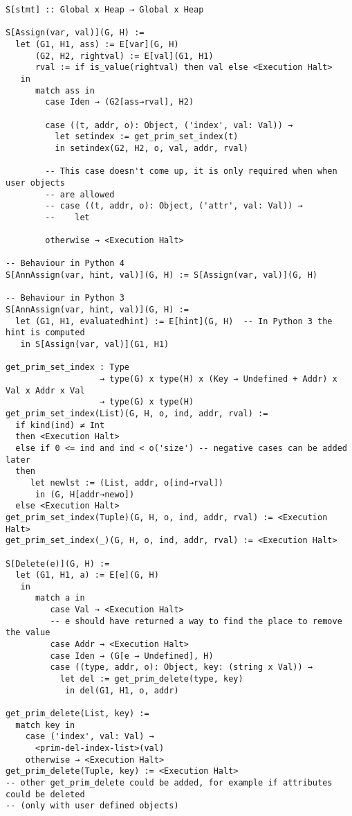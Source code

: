 \begin{verbatim}
S[stmt] :: Global x Heap → Global x Heap

S[Assign(var, val)](G, H) :=
  let (G1, H1, ass) := E[var](G, H)
      (G2, H2, rightval) := E[val](G1, H1)
      rval := if is_value(rightval) then val else <Execution Halt>
   in
      match ass in
        case Iden → (G2[ass→rval], H2)

        case ((t, addr, o): Object, ('index', val: Val)) →
          let setindex := get_prim_set_index(t)
          in setindex(G2, H2, o, val, addr, rval)

        -- This case doesn't come up, it is only required when when user objects
        -- are allowed
        -- case ((t, addr, o): Object, ('attr', val: Val)) →
        --    let

        otherwise → <Execution Halt>

-- Behaviour in Python 4
S[AnnAssign(var, hint, val)](G, H) := S[Assign(var, val)](G, H)

-- Behaviour in Python 3
S[AnnAssign(var, hint, val)](G, H) :=
  let (G1, H1, evaluatedhint) := E[hint](G, H)  -- In Python 3 the hint is computed
   in S[Assign(var, val)](G1, H1)

get_prim_set_index : Type
                   → type(G) x type(H) x (Key → Undefined + Addr) x Val x Addr x Val
                   → type(G) x type(H)
get_prim_set_index(List)(G, H, o, ind, addr, rval) :=
  if kind(ind) ≠ Int
  then <Execution Halt>
  else if 0 <= ind and ind < o('size') -- negative cases can be added later
  then
     let newlst := (List, addr, o[ind→rval])
      in (G, H[addr→newo])
  else <Execution Halt>
get_prim_set_index(Tuple)(G, H, o, ind, addr, rval) := <Execution Halt>
get_prim_set_index(_)(G, H, o, ind, addr, rval) := <Execution Halt>

S[Delete(e)](G, H) :=
  let (G1, H1, a) := E[e](G, H)
   in
      match a in
         case Val → <Execution Halt>
         -- e should have returned a way to find the place to remove the value
         case Addr → <Execution Halt>
         case Iden → (G[e → Undefined], H)
         case ((type, addr, o): Object, key: (string x Val)) →
           let del := get_prim_delete(type, key)
            in del(G1, H1, o, addr)

get_prim_delete(List, key) :=
  match key in
    case ('index', val: Val) →
      <prim-del-index-list>(val)
    otherwise → <Execution Halt>
get_prim_delete(Tuple, key) := <Execution Halt>
-- other get_prim_delete could be added, for example if attributes could be deleted
-- (only with user defined objects)


\end{verbatim}
